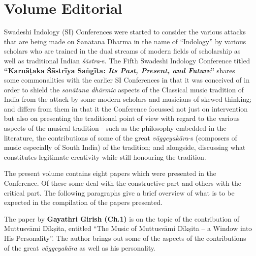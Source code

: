 
\chapter*{Volume Editorial}\label{volumeeditorial}

\vspace{-.5cm}


Swadeshi Indology (SI) Conferences were started to consider the various attacks that are being made on Sanātana Dharma in the name of “Indology” by various scholars who are trained in the dual streams of modern fields of scholarship as well as traditional Indian \textit{śāstra}-s. The Fifth Swadeshi Indology Conference titled \textbf{“Karnāṭaka Śāstrīya Saṅgīta: \textit{Its Past, Present, and Future}”} shares some commonalities with the earlier SI Conferences in that it was conceived of in order to shield the \textit{sanātana dhārmic} aspects of the Classical music tradition of India from the attack by some modern scholars and musicians of skewed thinking; and differs from them in that it the Conference focussed not just on intervention but also on presenting the traditional point of view with regard to the various aspects of the musical tradition - such as the philosophy embedded in the literature, the contributions of some of the great \textit{vāggeyakāra}-s (composers of music especially of South India) of the tradition; and alongside, discussing what constitutes legitimate creativity while still honouring the tradition.

The present volume contains eight papers which were presented in the Conference. Of these some deal with the constructive part and others with the critical part. The following paragraphs give a brief overview of what is to be expected in the compilation of the papers presented.

\vspace{-.2cm}

\delimiter


\vspace{-.5cm}

The paper by \textbf{Gayathri Girish (Ch.1)} is on the topic of the contribution of Muttusvāmi Dīkṣita, entitled “The Music of Muttusvāmi Dīkṣita – a Window into His Personality”. The author brings out some of the aspects of the contributions of the great \textit{vāggeyakāra} as well as his personality.

